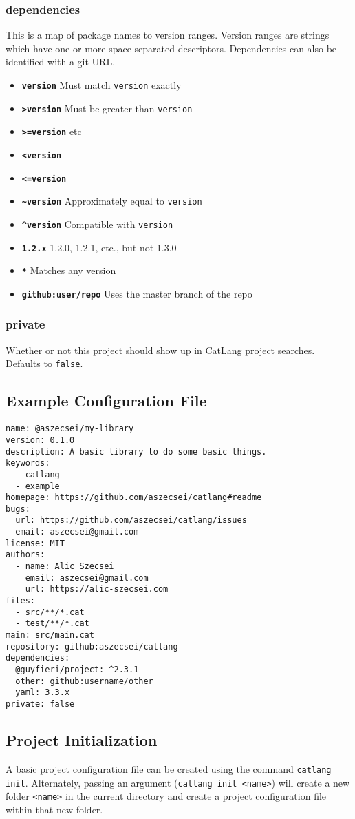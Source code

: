\documentclass[12pt]{article}
\begin{document}
\subsubsection{dependencies}
This is a map of package names to version ranges. Version ranges are strings which have one or more space-separated descriptors. Dependencies can also be identified with a git URL.

\begin{itemize}
	\item \texttt{\textbf{version}} Must match \texttt{version} exactly
	\item \texttt{\textbf{>version}} Must be greater than \texttt{version}
	\item \texttt{\textbf{>=version}} etc
	\item \texttt{\textbf{<version}}
	\item \texttt{\textbf{<=version}}
	\item \texttt{\textbf{\textasciitilde version}} Approximately equal to \texttt{version}
	\item \texttt{\textbf{\textasciicircum version}} Compatible with \texttt{version}
	\item \texttt{\textbf{1.2.x}} 1.2.0, 1.2.1, etc., but not 1.3.0
	\item \texttt{\textbf{*}} Matches any version
	\item \texttt{\textbf{github:user/repo}} Uses the master branch of the repo
\end{itemize}

\subsubsection{private}
Whether or not this project should show up in CatLang project searches. Defaults to \texttt{false}.

\subsection{Example Configuration File}

\begin{lstlisting}
name: @aszecsei/my-library
version: 0.1.0
description: A basic library to do some basic things.
keywords:
  - catlang
  - example
homepage: https://github.com/aszecsei/catlang#readme
bugs:
  url: https://github.com/aszecsei/catlang/issues
  email: aszecsei@gmail.com
license: MIT
authors:
  - name: Alic Szecsei
    email: aszecsei@gmail.com
    url: https://alic-szecsei.com
files:
  - src/**/*.cat
  - test/**/*.cat
main: src/main.cat
repository: github:aszecsei/catlang
dependencies:
  @guyfieri/project: ^2.3.1
  other: github:username/other
  yaml: 3.3.x
private: false
\end{lstlisting}

\subsection{Project Initialization}

A basic project configuration file can be created using the command \texttt{catlang init}. Alternately, passing an argument (\texttt{catlang init <name>}) will create a new folder \texttt{<name>} in the current directory and create a project configuration file within that new folder.
\end{document}
